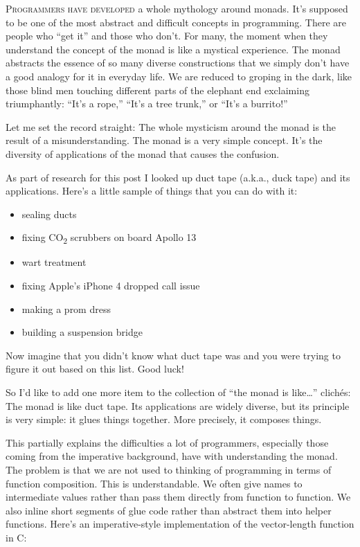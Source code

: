 
\lettrine[lhang=0.17]{P}{rogrammers have developed} a whole mythology around monads. It's
supposed to be one of the most abstract and difficult concepts in
programming. There are people who ``get it'' and those who don't. For
many, the moment when they understand the concept of the monad is like a
mystical experience. The monad abstracts the essence of so many diverse
constructions that we simply don't have a good analogy for it in
everyday life. We are reduced to groping in the dark, like those blind
men touching different parts of the elephant end exclaiming
triumphantly: ``It's a rope,'' ``It's a tree trunk,'' or ``It's a
burrito!''

Let me set the record straight: The whole mysticism around the monad is
the result of a misunderstanding. The monad is a very simple concept.
It's the diversity of applications of the monad that causes the
confusion.

As part of research for this post I looked up duct tape (a.k.a., duck
tape) and its applications. Here's a little sample of things that you
can do with it:

\begin{itemize}
\tightlist
\item
  sealing ducts
\item
  fixing CO\textsubscript{2} scrubbers on board Apollo 13
\item
  wart treatment
\item
  fixing Apple's iPhone 4 dropped call issue
\item
  making a prom dress
\item
  building a suspension bridge
\end{itemize}

\noindent
Now imagine that you didn't know what duct tape was and you were trying
to figure it out based on this list. Good luck!

So I'd like to add one more item to the collection of ``the monad is
like\ldots{}'' clichés: The monad is like duct tape. Its applications
are widely diverse, but its principle is very simple: it glues things
together. More precisely, it composes things.

This partially explains the difficulties a lot of programmers,
especially those coming from the imperative background, have with
understanding the monad. The problem is that we are not used to thinking
of programming in terms of function composition. This is understandable.
We often give names to intermediate values rather than pass them
directly from function to function. We also inline short segments of
glue code rather than abstract them into helper functions. Here's an
imperative-style implementation of the vector-length function in C:

